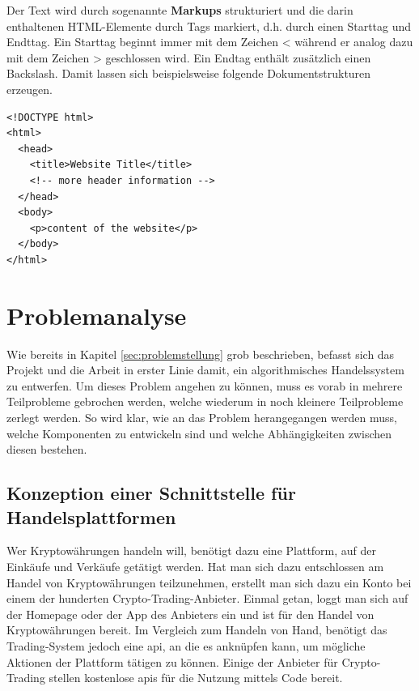 \documentclass[oneside]{ausarbeitung}
\begin{document}
Der Text wird durch sogenannte \textbf{Markups} strukturiert und die darin enthaltenen HTML-Elemente durch Tags markiert, d.h. durch einen Starttag und Endttag. Ein Starttag beginnt immer mit dem Zeichen < während er analog dazu mit dem Zeichen > geschlossen wird. Ein Endtag enthält zusätzlich einen Backslash. Damit lassen sich beispielsweise folgende Dokumentstrukturen erzeugen. \\

\lstset{language=HTML}
\lstset{frame=lines}
\lstset{basicstyle=\footnotesize}
\begin{lstlisting}
<!DOCTYPE html>
<html>
  <head>
    <title>Website Title</title>
    <!-- more header information -->
  </head>
  <body>
    <p>content of the website</p>
  </body>
</html>
\end{lstlisting}


\chapter{Problemanalyse}
\label{cha:problemanalyse}

Wie bereits in Kapitel \ref{sec:problemstellung} grob beschrieben,
befasst sich das Projekt und die Arbeit in erster Linie damit, ein
algorithmisches Handelssystem zu entwerfen. Um dieses Problem angehen
zu können, muss es vorab in mehrere Teilprobleme gebrochen werden,
welche wiederum in noch kleinere Teilprobleme zerlegt werden. So wird
klar, wie an das Problem herangegangen werden muss, welche Komponenten
zu entwickeln sind und welche Abhängigkeiten zwischen diesen
bestehen.


\section{Konzeption einer Schnittstelle für Handelsplattformen}
\label{sec:schnittstelle_handelsplatform}

Wer Kryptowährungen handeln will, benötigt dazu eine Plattform, auf
der Einkäufe und Verkäufe getätigt werden. Hat man sich dazu
entschlossen am Handel von Kryptowährungen teilzunehmen, erstellt man
sich dazu ein Konto bei einem der hunderten Crypto-Trading-Anbieter.
Einmal getan, loggt man sich auf der Homepage oder der App des
Anbieters ein und ist für den Handel von Kryptowährungen bereit. Im
Vergleich zum Handeln von Hand, benötigt das Trading-System jedoch
eine \ac{api}, an die es anknüpfen kann, um mögliche Aktionen der
Plattform tätigen zu können. Einige der Anbieter für Crypto-Trading
stellen kostenlose \ac{api}s für die Nutzung mittels Code bereit.
\end{document}
